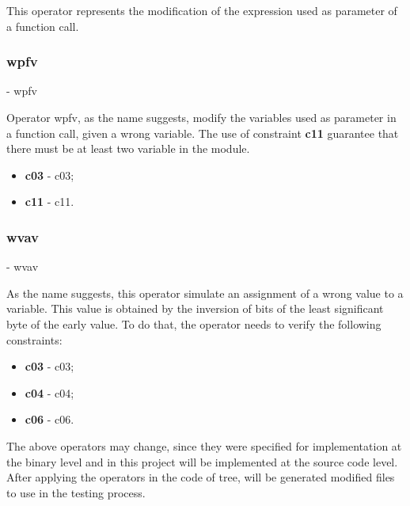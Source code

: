 	This operator represents the modification of the expression used as parameter of a function call.


	\subsubsection{\textbf{\acs{wpfv}}} - \Acl{wpfv}

	Operator \ac{wpfv}, as the name suggests, modify the variables used as parameter in a function call, given a wrong variable. The use of constraint \textbf{\acs{c11}} guarantee that there must be at least two variable in the module.

	\begin{itemize}
		\item \textbf{\acs{c03}} - \Acl{c03};
		\item \textbf{\acs{c11}} - \Acl{c11}.
	\end{itemize}

	\subsubsection{\textbf{\acs{wvav}}} - \Acl{wvav}

	As the name suggests, this operator simulate an assignment of a wrong value to a variable. This value is obtained by the inversion of bits of the least significant byte of the early value. To do that, the operator needs to verify the following constraints:

	\begin{itemize}
		\item \textbf{\acs{c03}} - \Acl{c03};
		\item \textbf{\acs{c04}} - \Acl{c04};
		\item \textbf{\acs{c06}} - \Acl{c06}.
	\end{itemize}

The above operators may change, since they were specified for implementation at the binary level and in this project will be implemented at the source code level.
After applying the operators in the code of tree, will be generated modified files to use in the testing process.

\clearpage
